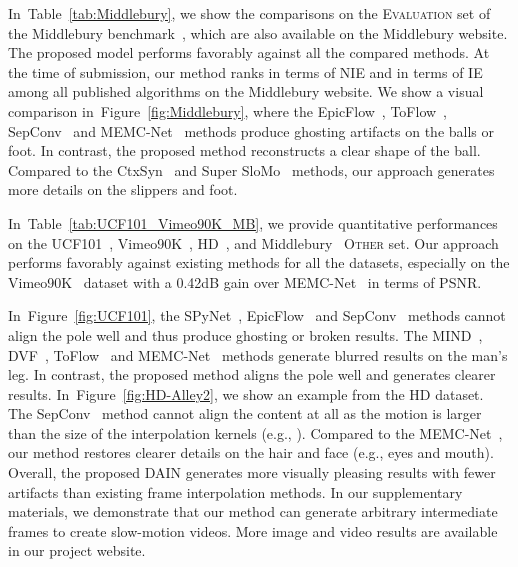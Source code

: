 \documentclass[10pt,twocolumn,letterpaper]{article}
\newcommand{\figref}[1]{Figure~\ref{fig:#1}}
\newcommand{\tabref}[1]{Table~\ref{tab:#1}}
\begin{document}
	
	In~\tabref{Middlebury}, we show the comparisons on the \textsc{Evaluation} set of the Middlebury benchmark~\cite{baker2011database}, which are also available on the Middlebury website.
The proposed model performs favorably against all the compared methods.
At the time of submission, our method ranks  in terms of NIE and  in terms of IE among all published algorithms on the Middlebury website.
We show a visual comparison in~\figref{Middlebury}, where the EpicFlow~\cite{revaud2015epicflow}, ToFlow~\cite{xue2017video}, SepConv~\cite{niklaus2017videoSepConv} and MEMC-Net~\cite{bao2018MEMC-Net} methods produce ghosting artifacts on the balls or foot.
In contrast, the proposed method reconstructs a clear shape of the ball.
Compared to the CtxSyn~\cite{niklaus2018context} and Super SloMo~\cite{jiang2017super} methods, our approach generates more details on the slippers and foot.
	
	
	
	
	In~\tabref{UCF101_Vimeo90K_MB}, we provide quantitative performances on the UCF101~\cite{soomro2012ucf101}, Vimeo90K~\cite{xue2017video}, HD~\cite{bao2018MEMC-Net}, and Middlebury~\cite{baker2011database} \textsc{Other} set.
Our approach performs favorably against existing methods for all the datasets, especially on the Vimeo90K~\cite{xue2017video} dataset with a 0.42dB gain over MEMC-Net~\cite{bao2018MEMC-Net} in terms of PSNR.
	
	
In~\figref{UCF101}, the SPyNet~\cite{ranjan2017optical}, EpicFlow~\cite{revaud2015epicflow} and SepConv~\cite{niklaus2017videoSepConv} methods cannot align the pole well and thus produce ghosting or broken results.
The MIND~\cite{long2016learning}, DVF~\cite{liu2017video}, ToFlow~\cite{xue2017video} and MEMC-Net~\cite{bao2018MEMC-Net} methods generate blurred results on the man's leg.
In contrast, the proposed method aligns the pole well and generates clearer results.
In~\figref{HD-Alley2}, we show an example from the HD dataset.
The SepConv~\cite{niklaus2017videoSepConv} method cannot align the content at all as the motion is larger than the size of the interpolation kernels (e.g., ).
Compared to the MEMC-Net~\cite{bao2018MEMC-Net}, our method restores clearer details on the hair and face (e.g., eyes and mouth).
Overall, the proposed DAIN generates more visually pleasing results with fewer artifacts than existing frame interpolation methods.
In our supplementary materials, we demonstrate that our method can generate arbitrary intermediate frames to create  slow-motion videos.
More image and video results are available in our project website.
\end{document}
